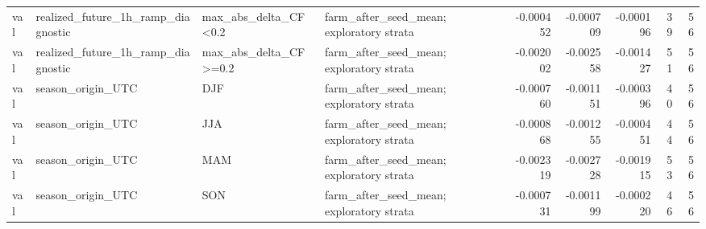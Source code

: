 \begin{tabular}{llllrrrrr}
val & realized\_future\_1h\_ramp\_diagnostic & max\_abs\_delta\_CF<0.2 & farm\_after\_seed\_mean; exploratory strata & -0.000452 & -0.000709 & -0.000196 & 39 & 56 \\
val & realized\_future\_1h\_ramp\_diagnostic & max\_abs\_delta\_CF>=0.2 & farm\_after\_seed\_mean; exploratory strata & -0.002002 & -0.002558 & -0.001427 & 51 & 56 \\
val & season\_origin\_UTC & DJF & farm\_after\_seed\_mean; exploratory strata & -0.000760 & -0.001151 & -0.000396 & 40 & 56 \\
val & season\_origin\_UTC & JJA & farm\_after\_seed\_mean; exploratory strata & -0.000868 & -0.001255 & -0.000451 & 44 & 56 \\
val & season\_origin\_UTC & MAM & farm\_after\_seed\_mean; exploratory strata & -0.002319 & -0.002728 & -0.001915 & 53 & 56 \\
val & season\_origin\_UTC & SON & farm\_after\_seed\_mean; exploratory strata & -0.000731 & -0.001199 & -0.000220 & 46 & 56 \\
\bottomrule
\end{tabular}
